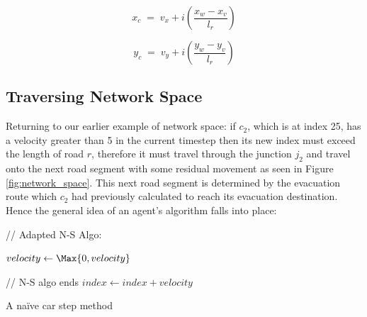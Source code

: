 \begin{equation}
    x_c \;=\; v_x + i(\frac{x_w - x_v}{l_r})
    \label{eq:vector_global}
\end{equation}

\begin{equation}
    y_c \;=\; v_y + i(\frac{y_w - y_v}{l_r})
    \label{eq:vector_global}
\end{equation}

\subsection{Traversing Network Space}
Returning to our earlier example of network space: if $c_2$, which is at index 25, has a velocity greater than 5 in the current timestep then its new index must exceed the length of road $r$, therefore it must travel through the junction $j_2$ and travel onto the next road segment with some residual movement as seen in Figure \ref{fig:network_space}. This next road segment is determined by the evacuation route which $c_2$ had previously calculated to reach its evacuation destination. Hence the general idea of an agent's  algorithm falls into place:

\vspace{0.5cm}
\begin{algorithm}[H]
    // Adapted N-S Algo:
    
    
    
    $velocity \leftarrow \Max{0,velocity}$\;
    
    // N-S algo ends
    \BlankLine
    $index \leftarrow index + velocity$\;
    
    \Location{}\;
    
    \caption{A naïve car step method}
    \label{alg:naive_step}
\end{algorithm}
\vspace{0.5cm}


